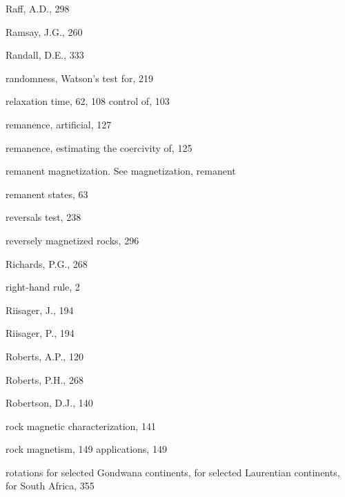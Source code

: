 \documentclass[,plain]{tauxe}
\begin{document}
\begin{theindex}
  \item Raff, A.D., 298
  \item Ramsay, J.G., 260
  \item Randall, D.E., 333
  \item randomness, Watson's test for, 219
\item relaxation time, 62, 108
    \subitem control of, 103
  \item remanence, artificial, 127
  \item remanence, estimating the coercivity of, 125
  \item remanent magnetization. See magnetization, remanent
  \item remanent states, 63
  \item reversals test, 238
  \item reversely magnetized rocks, 296
  \item Richards, P.G., 268
  \item right-hand rule, 2
  \item Riisager, J., 194
  \item Riisager, P., 194
  \item Roberts, A.P., 120
  \item Roberts, P.H., 268
  \item Robertson, D.J., 140
  \item rock magnetic characterization, 141
  \item rock magnetism, 149
    \subitem applications, 149
  \item rotations
    \subitem for selected Gondwana continents,
    \subitem for selected Laurentian continents,
    \subitem for South Africa, 355

  \indexspace


\end{theindex}
\end{document}
